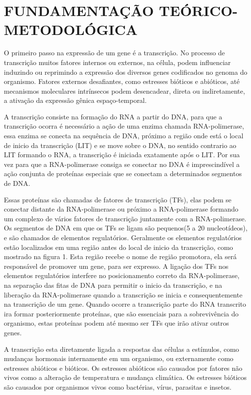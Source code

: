 \chapter{FUNDAMENTAÇÃO TEÓRICO-METODOLÓGICA}


O primeiro passo na expressão de um gene é a transcrição. No processo de transcrição muitos fatores internos ou externos, na célula, podem influenciar induzindo ou reprimindo a expressão dos diversos genes codificados no genoma do organismo. Fatores externos desafiantes, como estresses bióticos e abióticos, até mecanismos moleculares intrínsecos podem desencadear, direta ou indiretamente, a ativação da expressão gênica espaço-temporal.

A transcrição consiste na formação do RNA a partir do DNA, para que a transcrição ocorra é necessário a ação de uma enzima chamada RNA-polimerase, essa enzima se conecta na sequência de DNA, próximo a região onde está o local de inicio da transcrição (LIT) e se move sobre o DNA, no sentido contrario ao LIT formando o RNA, a transcrição é iniciada exatamente após o LIT. Por sua vez para que a RNA-polimerase consiga se conectar no DNA é imprescindível a ação conjunta de proteínas especiais que se conectam a determinados segmentos de DNA.

Essas proteínas são chamadas de fatores de transcrição (TFs), elas podem se conectar distante da RNA-polimerase ou próximo a RNA-polimerase formando um complexo de vários fatores de transcrição juntamente com a RNA-polimerase. Os segmentos de DNA em que os TFs se ligam são pequenos(5 a 20 nucleotídeos), e são chamados de elementos regulatórios. Geralmente os elementos regulatórios estão  localizados em uma região antes do local de inicio da transcrição, como mostrado na figura 1. Esta região recebe o nome de região promotora, ela será responsável de promover um gene, para ser expresso. A ligação dos TFs nos elementos regulatórios interfere no posicionamento correto da RNA-polimerase, na separação das fitas de DNA para permitir o inicio da transcrição, e na liberação da RNA-polimerase quando a transcrição se inicia e consequentemente na transcrição de um gene. Quando ocorre a transcrição parte do RNA transcrito ira formar posteriormente proteínas, que são essenciais para a sobrevivência do organismo, estas proteínas podem até mesmo ser TFs que irão ativar outros genes.

A transcrição esta diretamente ligada a respostas das células a estímulos, como mudanças hormonais internamente em um organismo, ou externamente como estresses abióticos e bióticos. Os estresses abióticos são causados por fatores não vivos como a alteração de temperatura e mudança climática. Os estresses bióticos são causados por organismos vivos como bactérias, vírus, parasitas e insetos.


